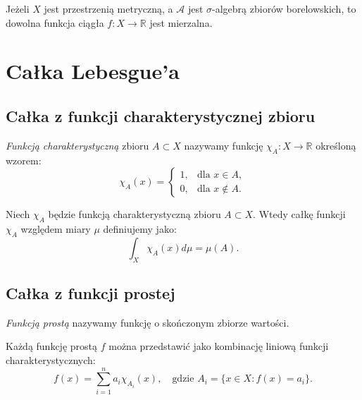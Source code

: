 	\begin{tw}
		Jeżeli $X$ jest przestrzenią metryczną, a $\mathcal{A}$ jest $\sigma$-algebrą zbiorów borelowskich, to dowolna funkcja ciągła $f: X \rightarrow \mathbb{R}$ jest mierzalna.
	\end{tw}
		
	\section{Całka  Lebesgue’a}
	\subsection{Całka z funkcji charakterystycznej zbioru}
	\begin{df}
	\textit{Funkcją charakterystyczną} zbioru $A \subset X$ nazywamy funkcję $\chi_{A} : X \rightarrow \mathbb{R}$ określoną wzorem:		
		\begin{equation}
			\chi_A(x) = 
			\begin{cases}
				1, &\text{dla $x \in A$}, \\
				0, &\text{dla $x \not \in A$}.
			\end{cases}
		\end{equation}
	\end{df}
	
	\begin{df}
		Niech $\chi_{A}$ będzie funkcją charakterystyczną  zbioru $A \subset X$. Wtedy całkę funkcji $\chi_{A}$ względem miary $\mu$ definiujemy jako:
		\begin{equation}
		\int_X \chi_{A}(x) d \mu = \mu(A).
		\end{equation}
	\end{df}
	
	\subsection{Całka z funkcji prostej}
	\begin{df}
		\textit{Funkcją prostą} nazywamy funkcję o skończonym zbiorze wartości. 
	\end{df}
	\begin{uwg}
		Każdą funkcję prostą $f$ można przedstawić jako kombinację liniową funkcji charakterystycznych:
		\begin{equation}
			f(x) = \sum_{i=1}^n a_i \chi_{A_i}(x), \quad \text{gdzie } A_i = \{ x \in X : f(x) =  a_i \}.
		\end{equation}
	\end{uwg}	
	
